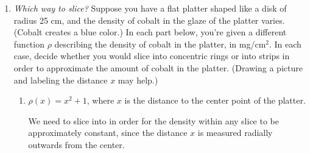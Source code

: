 \documentclass{article}
\begin{document}
\begin{enumerate}

\item \emph{Which way to slice?}
Suppose you have a flat platter shaped like a disk of radius 25 cm, and
  the density of cobalt in the glaze of the platter varies. 
  (Cobalt creates a blue color.) In each part below, you're
  given a different function $\rho$ describing the density of cobalt
  in the
  platter, in mg/cm$^2$.  In each case, decide whether you would slice
  into concentric rings or into strips in order to approximate the amount
  of cobalt in the platter. (Drawing a picture and labeling the distance $x$ may help.)


  \begin{enumerate}
  \item 
    \begin{problem}[\vfill]
      $\rho(x) = x^2 + 1$, where $x$ is the distance to the center point
      of the platter.
    \end{problem}

    \begin{solution}
      We need to slice into  in order for the
      density within any slice to be approximately constant, since the distance $x$ is measured radially outwards from the center.
      
    \end{solution}


\end{enumerate}
\end{enumerate}
\end{document}
